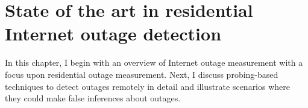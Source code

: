 
\chapter{State of the art in residential Internet outage detection}

\label{cpt:bg}

In this chapter, I begin with an overview of Internet outage
measurement with a focus upon residential outage measurement. Next, I
discuss probing-based techniques to detect outages remotely in detail
and illustrate scenarios where they could make false inferences about
outages.











